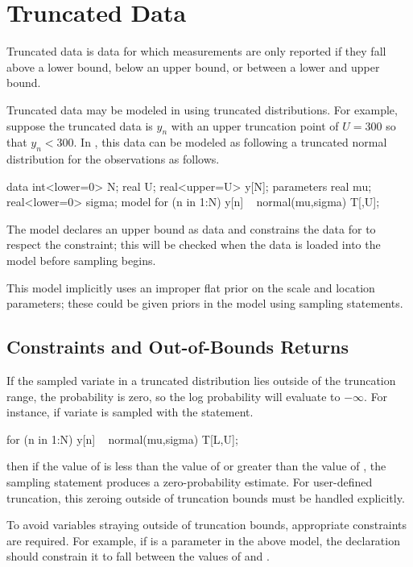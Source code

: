 \section{Truncated Data}\label{truncated-data.section}

Truncated data is data for which measurements are only reported if
they fall above a lower bound, below an upper bound, or between a
lower and upper bound.  

Truncated data may be modeled in \Stan using truncated distributions.
For example, suppose the truncated data is $y_n$ with an upper
truncation point of $U = 300$ so that $y_n < 300$.  In \Stan, this
data can be modeled as following a truncated normal distribution for
the observations as follows. 
%
\begin{stancode}
data {
  int<lower=0> N;
  real U;
  real<upper=U> y[N];
} 
parameters {
  real mu;
  real<lower=0> sigma;
} 
model {
  for (n in 1:N)
    y[n] ~ normal(mu,sigma) T[,U];
}
\end{stancode}
% 
The model declares an upper bound  as data and constrains
the data for  to respect the constraint;  this will be checked
when the data is loaded into the model before sampling begins.

This model implicitly uses an improper flat prior on the scale and
location parameters; these could be given priors in the model using
sampling statements.

\subsection{Constraints and Out-of-Bounds Returns}

If the sampled variate in a truncated distribution lies outside of
the truncation range, the probability is zero, so the log probability
will evaluate to $-\infty$.  For instance, if variate  is
sampled with the statement.
%
\begin{stancode}
for (n in 1:N) 
  y[n] ~ normal(mu,sigma) T[L,U];
\end{stancode}
%
then if the value of  is less than the value of 
or greater than the value of , the sampling statement produces
a zero-probability estimate.  For user-defined truncation, this
zeroing outside of truncation bounds must be handled explicitly.

To avoid variables straying outside of truncation bounds, appropriate
constraints are required.  For example, if  is a parameter in
the above model, the declaration should constrain it to fall between
the values of  and .
%
\begin{stancode}
parameters {
  real<lower=L,upper=U> y[N];
  ...
\end{stancode}

